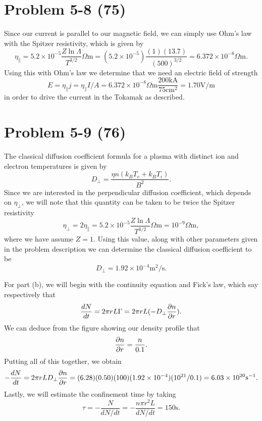 \section*{Problem 5-8 (75)}
\label{sec:5-8}
Since our current is parallel to our magnetic field, we can simply use Ohm's law with the Spitzer resistivity, which is given by
\begin{equation*}
	\eta_{\parallel} = 5.2\times 10^{-5}\dfrac{Z\ln\Lambda}{T^{3/2}}\Omega \text{m} = (5.2\times 10^{-5})\dfrac{(1)(13.7)}{(500)^{3/2}} = 6.372\times 10^{-8} \Omega \text{m}.
\end{equation*}
Using this with Ohm's law we determine that we need an electric field of strength
\begin{equation*}
	E = \eta_{\parallel}j = \eta_{\parallel} I/A = 6.372\times 10^{-8} \Omega \text{m} \dfrac{200\text{kA}}{75\text{cm}^2} = 1.70\text{V/m}
\end{equation*}
in order to drive the current in the Tokamak as described.

\section*{Problem 5-9 (76)}
\label{sec:5-9}
The classical diffusion coefficient formula for a plasma with distinct ion and electron temperatures is given by
\begin{equation*}
	D_\perp = \dfrac{\eta n \left(k_BT_e + k_BT_i\right)}{B^2}.
\end{equation*}
Since we are interested in the perpendicular diffusion coefficient, which depends on \(\eta_\perp\), we will note that this quantity can be taken to be twice the Spitzer resistivity
\begin{equation*}
	\eta_{\perp} = 2\eta_{\parallel} = 5.2\times 10^{-5}\dfrac{Z\ln\Lambda}{T^{3/2}}\Omega \text{m} =10^{-9}\Omega \text{m},
\end{equation*}
where we have assume \(Z=1\). Using this value, along with other parameters given in the problem description we can determine the classical diffusion coefficient to be
\begin{equation*}
	D_{\perp} = 1.92\times 10^{-4}\text{m}^2\text{/s}.
\end{equation*}

For part (b), we will begin with the continuity equation and Fick's law, which say respectively that
\begin{equation*}
	\frac{d N}{d t} = 2\pi rL\Gamma = 2\pi r L (-D_\perp\frac{\partial n}{\partial r}).
\end{equation*}
We can deduce from the figure showing our density profile that
\begin{equation*}
	\frac{\partial n}{\partial r} = \dfrac{n}{0.1}.
\end{equation*}
Putting all of this together, we obtain
\begin{equation*}
	-\frac{d N}{d t} = 2\pi r L D_\perp \frac{\partial n}{\partial r} = (6.28)(0.50)(100)(1.92\times 10^{-4})(10^{21}/0.1) = 6.03 \times 10^{20}\text{s}^{-1}.
\end{equation*}
Lastly, we will estimate the confinement time by taking 
\begin{equation*}
	\tau = -\dfrac{N}{dN/dt} = -\dfrac{n\pi r^2 L}{dN/dt} = 150\text{s}.
\end{equation*}

